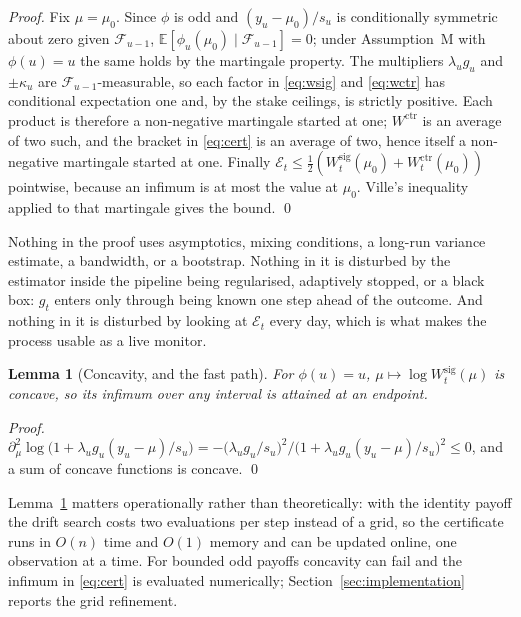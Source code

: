 \documentclass{article}
\theoremstyle{plain}
\newtheorem{lemma}[theorem]{Lemma}
\theoremstyle{definition}
\begin{document}
\begin{proof}
Fix $\mu=\mu_0$. Since $\phi$ is odd and $(y_u-\mu_0)/s_u$ is conditionally symmetric about
zero given $\mathcal{F}_{u-1}$, $\mathbb{E}[\phi_u(\mu_0)\mid\mathcal{F}_{u-1}]=0$; under
Assumption~M with $\phi(u)=u$ the same holds by the martingale property. The multipliers
$\lambda_ug_u$ and $\pm\kappa_u$ are $\mathcal{F}_{u-1}$-measurable, so each factor in
\eqref{eq:wsig} and \eqref{eq:wctr} has conditional expectation one and, by the stake
ceilings, is strictly positive. Each product is therefore a non-negative martingale started
at one; $W^{\mathrm{ctr}}$ is an average of two such, and the bracket in \eqref{eq:cert} is
an average of two, hence itself a non-negative martingale started at one. Finally
$\mathcal{E}_t\le\tfrac12(W^{\mathrm{sig}}_t(\mu_0)+W^{\mathrm{ctr}}_t(\mu_0))$ pointwise,
because an infimum is at most the value at $\mu_0$. Ville's inequality applied to that
martingale gives the bound. \qed
\end{proof}

Nothing in the proof uses asymptotics, mixing conditions, a long-run variance estimate, a
bandwidth, or a bootstrap. Nothing in it is disturbed by the estimator inside the pipeline
being regularised, adaptively stopped, or a black box: $g_t$ enters only through being
known one step ahead of the outcome. And nothing in it is disturbed by looking at
$\mathcal{E}_t$ every day, which is what makes the process usable as a live monitor.

\begin{lemma}[Concavity, and the fast path]
\label{lem:concave}
For $\phi(u)=u$, $\mu\mapsto\log W^{\mathrm{sig}}_t(\mu)$ is concave, so its infimum over
any interval is attained at an endpoint.
\end{lemma}

\begin{proof}
$\partial^2_\mu\log\big(1+\lambda_ug_u(y_u-\mu)/s_u\big)
 = -\big(\lambda_ug_u/s_u\big)^2\big/\big(1+\lambda_ug_u(y_u-\mu)/s_u\big)^2\le 0$,
and a sum of concave functions is concave. \qed
\end{proof}

Lemma~\ref{lem:concave} matters operationally rather than theoretically: with the identity
payoff the drift search costs two evaluations per step instead of a grid, so the certificate
runs in $O(n)$ time and $O(1)$ memory and can be updated online, one observation at a time.
For bounded odd payoffs concavity can fail and the infimum in \eqref{eq:cert} is evaluated
numerically; Section~\ref{sec:implementation} reports the grid refinement.
\end{document}
